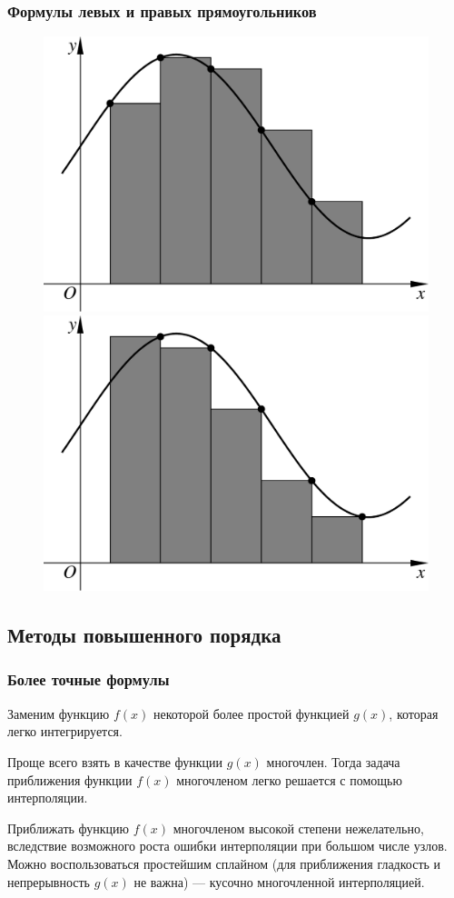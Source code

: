 \documentclass[apectratio=43,unicode]{beamer}
\begin{document}
\begin{frame}
\frametitle{Формулы левых и правых прямоугольников}
	\begin{figure}%
	\centering
	\includegraphics[width=.65\textheight]{lrect.pdf}%
	\quad
	\includegraphics[width=.65\textheight]{rrect.pdf}%
	\end{figure}
\end{frame}

\subsection{Методы повышенного порядка}
\begin{frame}
\frametitle{Более точные формулы}
	Заменим функцию $f(x)$ некоторой более простой функцией $g(x)$, которая легко
	интегрируется.
	\pause

	Проще всего взять в качестве функции $g(x)$ многочлен. Тогда задача приближения
	функции $f(x)$ многочленом легко решается с помощью интерполяции.
	\pause

	Приближать функцию $f(x)$ многочленом высокой степени нежелательно,
	вследствие возможного роста ошибки интерполяции при большом числе узлов.
	Можно воспользоваться простейшим сплайном (для приближения гладкость и
	непрерывность $g(x)$ не важна) --- кусочно многочленной интерполяцией.
\end{frame}
\end{document}
